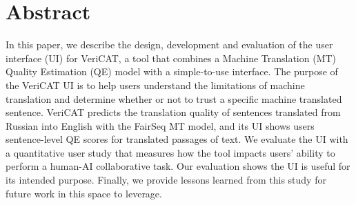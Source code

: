 \section{Abstract}


In this paper, we describe the design, development and evaluation of the user interface (UI) for VeriCAT, a tool that combines a Machine Translation (MT) Quality Estimation (QE) model with a simple-to-use interface. The purpose of the VeriCAT UI is to help users understand the limitations of machine translation and determine whether or not to trust a specific machine translated sentence. VeriCAT predicts the translation quality of sentences translated from Russian into English with the FairSeq MT model, and its UI shows users sentence-level QE scores for translated passages of text. We evaluate the UI with a quantitative user study that measures how the tool impacts users’ ability to perform a human-AI collaborative task. Our evaluation shows the UI is useful for its intended purpose. Finally, we provide lessons learned from this study for future work in this space to leverage.  

